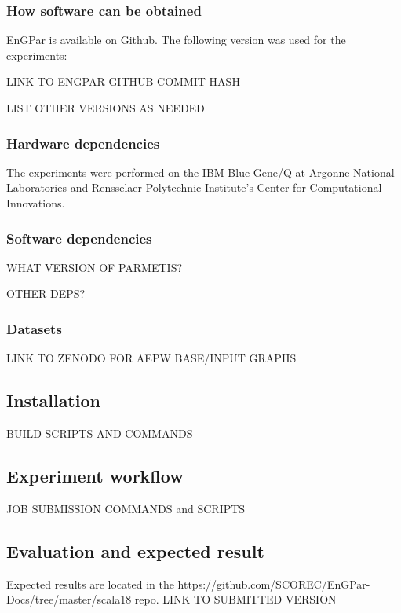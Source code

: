 \subsubsection{How software can be obtained}

EnGPar is available on Github.  The following version was used for the
experiments:

{\color{red} LINK TO ENGPAR GITHUB COMMIT HASH}

{\color{red} LIST OTHER VERSIONS AS NEEDED}

\subsubsection{Hardware dependencies}

The experiments were performed on the IBM Blue Gene/Q at Argonne National
Laboratories and Rensselaer Polytechnic Institute's Center for Computational
Innovations.

\subsubsection{Software dependencies}

{\color{red} WHAT VERSION OF PARMETIS?}

{\color{red} OTHER DEPS?}

\subsubsection{Datasets}

{\color{red} LINK TO ZENODO FOR AEPW BASE/INPUT GRAPHS}

\subsection{Installation}

{\color{red} BUILD SCRIPTS AND COMMANDS}

\subsection{Experiment workflow}

{\color{red} JOB SUBMISSION COMMANDS and SCRIPTS}

\subsection{Evaluation and expected result}

Expected results are located in the 
https://github.com/SCOREC/EnGPar-Docs/tree/master/scala18
repo.
{\color{red} LINK TO SUBMITTED VERSION}
